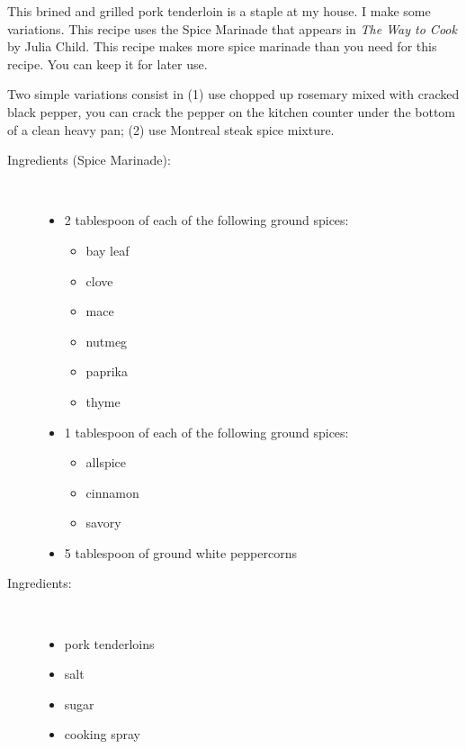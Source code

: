 \documentclass[11pt,letterpaper]{article}
\begin{document}


 
This brined and grilled pork tenderloin is a staple at my house. I make some variations. This recipe uses the Spice Marinade that appears in {\it The Way to Cook} by Julia Child. This  recipe makes more spice marinade than you need for this recipe. You can keep it for later use.
 
Two simple variations consist in (1) use chopped up rosemary mixed with cracked black pepper, you can crack the pepper on the kitchen counter under the bottom of a clean heavy pan; (2) use Montreal steak spice mixture.
 
\begin{description}

\item[Ingredients (Spice Marinade):]\ \\
	\begin{itemize}
	\item 2 tablespoon of each of the following ground spices:
		\begin{itemize}
		\item bay leaf
		\item clove
		\item mace
		\item nutmeg
		\item paprika
		\item thyme
		\end{itemize}
	\item 1 tablespoon of each of the following ground spices:
		\begin{itemize}
		\item allspice
		\item cinnamon
		\item savory
		\end{itemize}
	\item 5 tablespoon of ground white peppercorns
	\end{itemize}

\item[Ingredients:]\ \\
	\begin{itemize}
	\item pork tenderloins
	\item salt
	\item sugar
	\item cooking spray
	\end{itemize}


\end{description}
\end{document}
